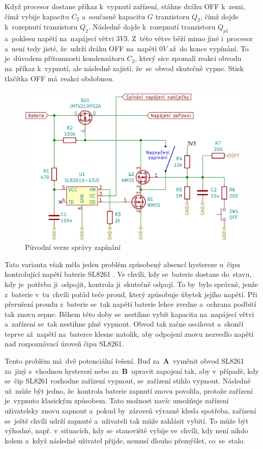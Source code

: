 Když procesor dostane příkaz k~vypnutí zařízení, stáhne dráhu OFF k~zemi, čímž vybije kapacitu \(C_{2}\) a~současně kapacitu \(G\) tranzistoru \(Q_{2}\), čímž dojde k~rozepnutí tranzistoru \(Q_{2}\).
Následně dojde k~rozepnutí tranzistoru \(Q_{p1}\) a~poklesu napětí na~napájecí větvi \(3V3\).
Z~této větve běží mimo jiné i~procesor a~není tedy jisté, že~udrží dráhu OFF na~napětí \(0V\) až~do konce vypínání.
To je~důvodem přítomnosti kondenzátoru \(C_{2}\), který sice zpomalí reakci obvodu na~příkaz k~vypnutí, ale následně zajistí, že~se~obvod skutečně vypne.
Stisk tlačítka OFF má~reakci obdobnou. 

\begin{figure}[h!]
    \centering
    \includegraphics[width=\textwidth]{text/PraktickaCast/img/stary_power_manager.png}
    \caption{Původní verze správy zapínání}
    \label{fig:stary_PoverManager}
\end{figure}

Tato varianta však měla jeden problém způsobený absencí hystereze u~čipu kontrolující napětí baterie SL8261 \cite{SL8261}.
Ve chvíli, kdy se~baterie dostane do~stavu, kdy je~potřeba ji~odpojit, kontrola ji~skutečně odpojí.
To by~bylo správně, jenže z~baterie v~tu~chvíli pořád teče proud, který způsobuje úbytek jejího napětí.
Při přerušení proudu z~baterie se~tak napětí baterie lehce zvedne a~ochrana podbití tak znovu sepne.
Během této doby se~nestihne vybít kapacita na~napájecí větvi a~zařízení se~tak nestihne plně vypnout.
Obvod tak začne oscilovat a~skončí teprve až~napětí na~baterce klesne natolik, aby odpojení znovu nezvedlo napětí nad rozpoznávací úroveň čipu SL8261.

Tento problém má~dvě potenciální řešení.
Buď za~{\bf A}~vyměnit obvod SL8261 za~jiný s~vhodnou hysterezí nebo za~{\bf B}~upravit zapojení tak, aby v~případě, kdy se~čip SL8261 rozhodne zařízení vypnout, se~zařízení stihlo vypnout.
Následně už~může být jedno, že~kontrola baterie zapnutí znovu povolila, protože zařízení je~vypnuto klasickým způsobem.
Tato možnost navíc umožňuje zařízení uživatelsky znovu zapnout a~pokud by~zároveň výrazně klesla spotřeba, zařízení se~ještě chvíli udrží zapnuté a~uživateli tak může zahlásit vybití.
To může být výhodné, např. v~situacích, kdy se~stanoviště vybije ve~chvíli, kdy není nikdo kolem a~když následně uživatel přijde, nemusí dlouho přemýšlet, co~se~stalo.

